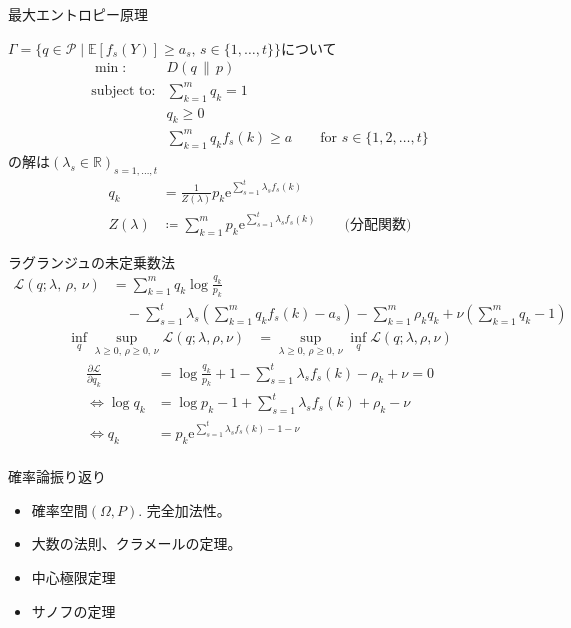 \documentclass[lualatex,handout]{beamer}
\newcommand{\expt}[1]{\mathbb{E}\left[#1\right]}
\newcommand\KL[2]{D\left(#1\,\|\,#2\right)}
\theoremstyle{definition}
\begin{document}
\begin{frame}{最大エントロピー原理}
\begin{theorem}
$\Gamma=\{q\in\mathcal{P}\mid \expt{f_s(Y)}\ge a_s,\, s\in\{1,\dotsc,t\}\}$について
\begin{align*}
\min\colon& \KL{q}{p}\\
\text{subject to}\colon& \sum_{k=1}^m q_k = 1\\
&q_k\ge 0\\
&\sum_{k=1}^m q_k f_s(k) \ge a\qquad \text{for } s\in\{1,2,\dotsc,t\} 
\end{align*}
の解は$(\lambda_s\in\mathbb{R})_{s=1,\dotsc,t}$
\begin{align*}
q_k &= \frac1{Z(\lambda)} p_k\mathrm{e}^{\sum_{s=1}^t \lambda_s f_s(k)}\\
Z(\lambda) &\coloneq \sum_{k=1}^m p_k\mathrm{e}^{\sum_{s=1}^t \lambda_s f_s(k)} \qquad \text{(分配関数)}
\end{align*}
\end{theorem}
\end{frame}

\begin{frame}{ラグランジュの未定乗数法}
\begin{align*}
\mathcal{L}(q;\lambda,\,\rho,\,\nu) &= \sum_{k=1}^m q_k\log\frac{q_k}{p_k}\\
&\quad - \sum_{s=1}^t \lambda_s \left(\sum_{k=1}^m q_k f_s(k) - a_s\right) - \sum_{k=1}^m \rho_k q_k + \nu \left(\sum_{k=1}^m q_k - 1\right)
\end{align*}
\begin{align*}
\inf_{q}\sup_{\lambda\ge 0,\, \rho\ge0,\, \nu} \mathcal{L}(q;\lambda,\rho,\nu) &= 
\sup_{\lambda\ge 0,\, \rho\ge0,\, \nu}\inf_{q} \mathcal{L}(q;\lambda,\rho,\nu)
\end{align*}
\begin{align*}
\frac{\partial \mathcal{L}}{\partial q_k} &= \log\frac{q_k}{p_k} + 1 - \sum_{s=1}^t \lambda_s f_s(k) - \rho_k + \nu = 0\\
\iff \log q_k &= \log p_k - 1 + \sum_{s=1}^t \lambda_s f_s(k) + \rho_k - \nu\\
\iff q_k &= p_k \mathrm{e}^{\sum_{s=1}^t \lambda_s f_s(k) - 1 - \nu}\\
\end{align*}
\end{frame}

\begin{frame}{確率論振り返り}
\begin{itemize}
\setlength{\itemsep}{2em}
\item 確率空間$(\Omega, P)$. 完全加法性。
\item 大数の法則、クラメールの定理。
\item 中心極限定理
\item サノフの定理
\end{itemize}
\end{frame}
\end{document}
